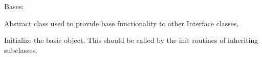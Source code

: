 \documentclass[letterpaper,10pt,english]{sphinxmanual}
\begin{document}

\begin{fulllineitems}
\label{acitoolkit:acitoolkit.BaseInterface}
Bases: {\hyperref[acibaseobject:acibaseobject.BaseACIObject]{}}

Abstract class used to provide base functionality to other Interface
classes.

Initialize the basic object.  This should be called by the
init routines of inheriting subclasses.

\begin{fulllineitems}
\label{acitoolkit:acitoolkit.BaseInterface.get_port_channel_selector_json}
\end{fulllineitems}


\begin{fulllineitems}
\label{acitoolkit:acitoolkit.BaseInterface.get_port_selector_json}
\end{fulllineitems}


\end{fulllineitems}

\end{document}
